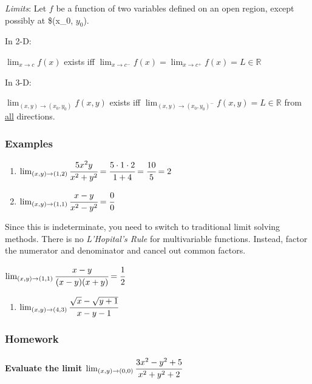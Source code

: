 \documentclass[
  letterpaper,
  DIV=11,
  numbers=noendperiod]{scrartcl}
\let\oldparagraph\paragraph
\renewcommand{\paragraph}[1]{\oldparagraph{#1}\mbox{}}
\providecommand{\tightlist}{%
  \setlength{\itemsep}{0pt}\setlength{\parskip}{0pt}}\usepackage{longtable,booktabs,array}
\begin{document}
\emph{Limits}: Let \(f\) be a function of two variables defined on an
open region, except possibly at \$(x\_0, \(y_0\)).

In 2-D:

\(\lim_{x\rightarrow c} f(x)\) exists iff
\(\lim_{x\rightarrow c^-} f(x) = \lim_{x\rightarrow c^+} f(x) = L \in \mathbb{R}\)

In 3-D:

\(\lim_{(x, y) \rightarrow (x_0, y_0)} f(x, y)\) exists iff
\(\lim_{(x, y) \rightarrow (x_0, y_0)^-} f(x, y) = L \in \mathbb{R}\)
from \ul{all} directions.

\hypertarget{examples-3}{%
\subsubsection{Examples}\label{examples-3}}

\begin{enumerate}
\def\labelenumi{\arabic{enumi}.}
\item
  \(\lim_{(x, y) \rightarrow (1, 2)} \cfrac{5x^2y}{x^2+y^2} = \cfrac{5 \cdot 1 \cdot 2}{1 + 4} = \cfrac{10}{5} = 2\)
\item
  \(\lim_{(x, y) \rightarrow (1, 1)} \cfrac{x-y}{x^2-y^2} = \cfrac{0}{0}\)
\end{enumerate}

Since this is indeterminate, you need to switch to traditional limit
solving methods. There is no \emph{L'Hopital's Rule} for multivariable
functions. Instead, factor the numerator and denominator and cancel out
common factors.

\(\lim_{(x, y) \rightarrow (1, 1)} \cfrac{x-y}{(x-y)(x+y)} = \cfrac{1}{2}\)

\begin{enumerate}
\def\labelenumi{\arabic{enumi}.}
\setcounter{enumi}{2}
\tightlist
\item
  \(\lim_{(x, y) \rightarrow (4, 3)} \cfrac{\sqrt{x}-\sqrt{y+1}}{x-y-1}\)
\end{enumerate}

\hypertarget{homework}{%
\subsubsection{Homework}\label{homework}}

\hypertarget{evaluate-the-limit-lim_x-y-rightarrow-0-0-cfrac3x2-y25x2y22}{%
\paragraph{\texorpdfstring{Evaluate the limit
\(\lim_{(x, y) \rightarrow (0, 0)} \cfrac{3x^2-y^2+5}{x^2+y^2+2}\)}{Evaluate the limit \textbackslash lim\_\{(x, y) \textbackslash rightarrow (0, 0)\} \textbackslash cfrac\{3x\^{}2-y\^{}2+5\}\{x\^{}2+y\^{}2+2\}}}\label{evaluate-the-limit-lim_x-y-rightarrow-0-0-cfrac3x2-y25x2y22}}
\end{document}
